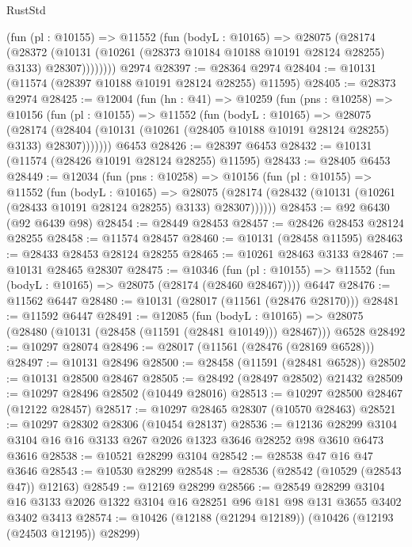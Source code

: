 \begin{lexlean}{RustStd}
\begin{coremodule}
          (fun (pl : @10155) =>
          @11552
            (fun (bodyL : @10165) =>
            @28075
              (@28174
                (@28372
                  (@10131 (@10261 (@28373 @10184 @10188 @10191 @28124 @28255) @3133) @28307))))))))
    @2974
@28397 := @28364 @2974
@28404 := @10131 (@11574 (@28397 @10188 @10191 @28124 @28255) @11595)
@28405 := @28373 @2974
@28425 := @12004
    (fun (hn : @41) =>
    @10259
      (fun (pns : @10258) =>
      @10156
        (fun (pl : @10155) =>
        @11552
          (fun (bodyL : @10165) =>
          @28075
            (@28174
              (@28404 (@10131 (@10261 (@28405 @10188 @10191 @28124 @28255) @3133) @28307)))))))
    @6453
@28426 := @28397 @6453
@28432 := @10131 (@11574 (@28426 @10191 @28124 @28255) @11595)
@28433 := @28405 @6453
@28449 := @12034
    (fun (pns : @10258) =>
    @10156
      (fun (pl : @10155) =>
      @11552
        (fun (bodyL : @10165) =>
        @28075 (@28174 (@28432 (@10131 (@10261 (@28433 @10191 @28124 @28255) @3133) @28307))))))
@28453 := @92 @6430 (@92 @6439 @98)
@28454 := @28449 @28453
@28457 := @28426 @28453 @28124 @28255
@28458 := @11574 @28457
@28460 := @10131 (@28458 @11595)
@28463 := @28433 @28453 @28124 @28255
@28465 := @10261 @28463 @3133
@28467 := @10131 @28465 @28307
@28475 := @10346
    (fun (pl : @10155) => @11552 (fun (bodyL : @10165) => @28075 (@28174 (@28460 @28467))))
    @6447
@28476 := @11562 @6447
@28480 := @10131 (@28017 (@11561 (@28476 @28170)))
@28481 := @11592 @6447
@28491 := @12085
    (fun (bodyL : @10165) => @28075 (@28480 (@10131 (@28458 (@11591 (@28481 @10149))) @28467)))
    @6528
@28492 := @10297 @28074
@28496 := @28017 (@11561 (@28476 (@28169 @6528)))
@28497 := @10131 @28496
@28500 := @28458 (@11591 (@28481 @6528))
@28502 := @10131 @28500 @28467
@28505 := @28492 (@28497 @28502) @21432
@28509 := @10297 @28496 @28502 (@10449 @28016)
@28513 := @10297 @28500 @28467 (@12122 @28457)
@28517 := @10297 @28465 @28307 (@10570 @28463)
@28521 := @10297 @28302 @28306 (@10454 @28137)
@28536 := @12136
    @28299
    @3104
    @3104
    @16
    @16
    @3133
    @267
    @2026
    @1323
    @3646
    @28252
    @98
    @3610
    @6473
    @3616
@28538 := @10521 @28299 @3104
@28542 := @28538 @47 @16 @47 @3646
@28543 := @10530 @28299
@28548 := @28536 (@28542 (@10529 (@28543 @47)) @12163)
@28549 := @12169 @28299
@28566 := @28549
    @28299
    @3104
    @16
    @3133
    @2026
    @1322
    @3104
    @16
    @28251
    @96
    @181
    @98
    @131
    @3655
    @3402
    @3402
    @3413
@28574 := @10426 (@12188 (@21294 @12189)) (@10426 (@12193 (@24503 @12195)) @28299)

\end{coremodule}
\end{lexlean}

